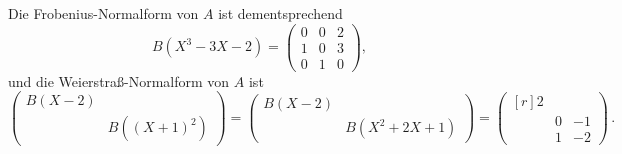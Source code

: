 Die Frobenius-Normalform von $A$ ist dementsprechend
\[
    B\left( X^3 - 3X - 2 \right)
  = \begin{pmatrix}
      0 & 0 & 2 \\
      1 & 0 & 3 \\
      0 & 1 & 0
    \end{pmatrix},
\]
und die Weierstraß-Normalform von $A$ ist
\[
    \begin{pmatrix}
      B(X-2)  &                         \\
              & B\left( (X+1)^2 \right)
    \end{pmatrix}
  = \begin{pmatrix}
      B(X-2)  &                         \\
              & B\left( X^2 + 2X + 1 \right)
    \end{pmatrix}
  = \begin{pmatrix*}[r]
      2 &   &     \\
        & 0 & -1  \\
        & 1 & -2
    \end{pmatrix*} \,.
\]




